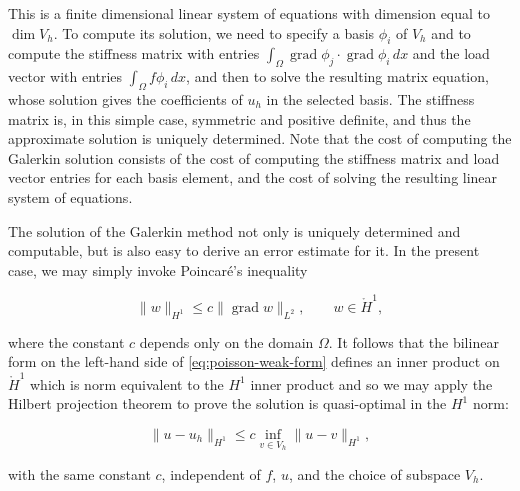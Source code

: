{This is a finite dimensional linear system of equations with dimension equal to $\dim V_h$. To compute its solution, we need to specify a basis $\phi_i$ of $V_h$ and to compute the stiffness matrix with entries $\int_\Omega\operatorname{grad}\phi_j\cdot\operatorname{grad}\phi_i\,dx$ and the load vector with entries $\int_\Omega f\phi_i\,dx$, and then to solve the resulting matrix equation, whose solution gives the coefficients of $u_h$ in the selected basis. The stiffness matrix is, in this simple case, symmetric and positive definite, and thus the approximate solution is uniquely determined. Note that the cost of computing the Galerkin solution consists of the cost of computing the stiffness matrix and load vector entries for each basis element, and the cost of solving the resulting linear system of equations.}

{The solution of the Galerkin method not only is uniquely determined and computable, but is also easy to derive an error estimate for it. In the present case, we may simply invoke Poincaré's inequality}

\[
\|w\|_{H^1}\le c\|\operatorname{grad}w\|_{L^2},\qquad w\in\mathring H^1,
\]

{where the constant $c$ depends only on the domain $\Omega$. It follows that the bilinear form on the left-hand side of \eqref{eq:poisson-weak-form} defines an inner product on $\mathring H^1$ which is norm equivalent to the $H^1$ inner product and so we may apply the Hilbert projection theorem to prove the solution is quasi-optimal in the $H^1$ norm:}

\begin{equation}\label{eq:galerkin-quasioptimality}
\|u-u_h\|_{H^1}\le c\inf_{v\in V_h}\|u-v\|_{H^1},
\end{equation}

{with the same constant $c$, independent of $f$, $u$, and the choice of subspace $V_h$.}

